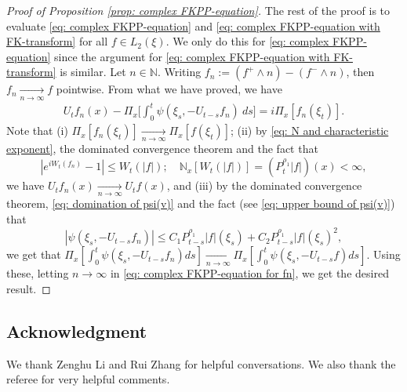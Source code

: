 \documentclass[12pt,a4paper]{amsart}
\theoremstyle{plain}
\theoremstyle{definition}
\numberwithin{equation}{section}
\begin{document}
\begin{proof}[Proof of Proposition \ref{prop: complex FKPP-equation}]
  The rest of the proof is to evaluate \eqref{eq: complex FKPP-equation} and \eqref{eq: complex FKPP-equation with FK-transform} for all $f\in L_2(\xi)$. We only do this for \eqref{eq: complex FKPP-equation} since the argument for \eqref{eq: complex FKPP-equation with FK-transform} is similar.
  Let $n \in \mathbb N$.
  Writing $f_n := (f^+ \wedge n) - (f^- \wedge n)$, then $f_n \xrightarrow[n\to \infty]{} f$ pointwise.
  From what we have proved, we have
  \begin{align}
    \label{eq: complex FKPP-equation for fn}
    U_tf_n(x) - \Pi_{x} \Big[\int_0^t \psi (\xi_s, - U_{t-s}f_n ) ~ds\Big]
    = i \Pi_{x} [f_n(\xi_t)].
  \end{align}
  Note that
  (i) $\Pi_{x}[f_n(\xi_t)] \xrightarrow[n\to \infty]{} \Pi_{x}[f(\xi_t)]$;
  (ii) by \eqref{eq: N and characteristic exponent}, the dominated convergence theorem and the fact that
  \[
     |e^{i W_t(f_n)} - 1| \leq W_t(|f|);
    \quad \mathbb N_x[W_t(|f|)] = (P_t^{\rho_1} |f|)(x) < \infty,
 \]
  we have $U_tf_n(x) \xrightarrow[n\to \infty]{} U_tf(x)$, and (iii) by the dominated convergence theorem, \eqref{eq: domination of psi(v)} and the fact (see \eqref{eq: upper bound of psi(v)}) that
  \[
    |\psi(\xi_s,- U_{t-s}f_n) |
    \leq C_1 P_{t-s}^{\rho_1}|f|(\xi_s)+C_2 P_{t-s}^{\rho_1}|f|(\xi_s)^2,
  \]
  we get that $\Pi_{x} [\int_0^t \psi(\xi_s,- U_{t-s}f_n)ds] \xrightarrow[n\to \infty]{} \Pi_{x} [\int_0^t \psi(\xi_s,- U_{t-s}f)ds]$.
  Using these, letting $n \to \infty$ in \eqref{eq: complex FKPP-equation for fn}, we get the desired result.
\end{proof}

\subsection*{Acknowledgment}
We thank Zenghu Li and Rui Zhang for helpful conversations.
We also thank the referee for very helpful comments.
\end{document}
